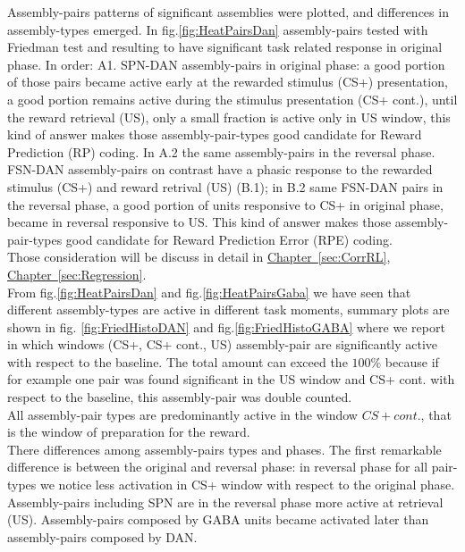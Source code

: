 Assembly-pairs patterns of significant assemblies were plotted, and differences in assembly-types emerged. In fig.\ref{fig:HeatPairsDan} assembly-pairs tested with Friedman test and resulting to have significant task related response in original phase. In order: A1. SPN-DAN assembly-pairs in original phase: a good portion of those pairs became active early at the rewarded stimulus (CS+) presentation, a good portion remains active during the stimulus presentation (CS+ cont.), until the reward retrieval (US), only a small fraction is active only in US window, this kind of answer makes those assembly-pair-types good candidate for Reward Prediction (RP) coding. In A.2 the same assembly-pairs in the reversal phase. FSN-DAN assembly-pairs on contrast have a phasic response to the rewarded stimulus (CS+) and reward retrival (US) (B.1); in B.2 same FSN-DAN pairs in the reversal phase, a good portion of units responsive to CS+ in original phase, became in reversal responsive to US. This kind of answer makes those assembly-pair-types good candidate for Reward Prediction Error (RPE) coding.\\ Those consideration will be discuss in detail in \hyperref[sec:CorrRL]{Chapter~\ref*{sec:CorrRL}}, \hyperref[sec:Regression]{Chapter~\ref*{sec:Regression}}.\\From fig.\ref{fig:HeatPairsDan} and fig.\ref{fig:HeatPairsGaba} we have seen that different assembly-types are active in different task moments, summary plots are shown in fig. \ref{fig:FriedHistoDAN} and fig.\ref{fig:FriedHistoGABA} where we report in which windows (CS+, CS+ cont., US) assembly-pair are significantly active with respect to the baseline. The total amount can exceed the $100\%$ because if for example one pair was found significant in the US window and CS+ cont. with respect to the baseline, this assembly-pair was double counted.\\All assembly-pair types are predominantly active in the window $CS+ cont.$, that is the window of preparation for the reward.\\There differences among assembly-pairs types and phases. The first remarkable difference is between the original and reversal phase: in reversal phase for all pair-types we notice less activation in CS+ window with respect to the original phase. Assembly-pairs including SPN are in the reversal phase more active at retrieval (US). Assembly-pairs composed by GABA units became activated later than assembly-pairs composed by DAN.
